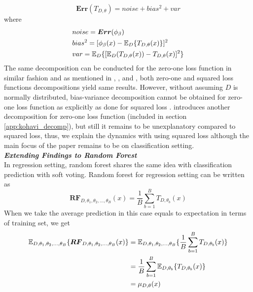 \begin{equation}
\boldsymbol{Err}(T_{D,\theta}) = noise + bias^2 + var
\end{equation}
\vspace{-3mm}
\qquad \qquad \qquad \quad where
\vspace{-6.3mm}
\begin{align}
& noise = \boldsymbol{Err}(\phi_{\beta}) \notag \\
& bias^2 = [\phi_{\beta}(x) - \mathbb{E}_{D}\{T_{D,\theta}(x)\}]^2 \notag \\
& var = \mathbb{E}_{D}\{[\mathbb{E}_{D}(T_{D,\theta}(x)) - T_{D,\theta}(x)]^2\} \notag
\end{align}
The same decomposition can be conducted for the zero-one loss function in similar fashion and as mentioned in 
\cite{louppe2014understanding}, \cite{domingos2000decomposition}, 
\cite{james2003variance} and \cite{friedman1997zeroLoss},
both zero-one and squared loss functions decompositions yield same results. 
However, without assuming $D$ is normally distributed, bias-variance decomposition 
cannot be obtained for zero-one loss function as explicitly as done for squared loss \cite{louppe2014understanding}. 
\cite{kohavi1996bias} introduces another decomposition for zero-one loss function (included in section \ref{app:kohavi_decomp}), 
but still it remains to be unexplanatory compared to squared loss, thus, 
we explain the dynamics with using squared loss although 
the main focus of the paper remains to be on classification setting.
\vspace{2mm}
\\
\textbf{\emph{Extending Findings to Random Forest }}\\
In regression setting, random forest shares the same idea with classification prediction with soft voting. 
Random forest for regression setting can be written as
\begin{equation}
\boldsymbol{RF}_{D, \theta_{1},\theta_{2},..., \theta_{B}}(x) = \dfrac{1}{B}\sum_{b = 1}^{B}T_{D,\theta_{b}}(x)
\end{equation}
When we take the average prediction in this case equals to expectation in terms of training set, we get
\begin{align}\label{eq:mu}
\mathbb{E}_{D, \theta_{1}, \theta_{2},..., \theta_{B}}\{\boldsymbol{RF}_{D, \theta_{1},\theta_{2},..., \theta_{B}}(x) \} 
	& = \mathbb{E}_{D, \theta_{1}, \theta_{2},..., \theta_{B}}\{\dfrac{1}{B}\sum_{b = 1}^{B}T_{D,\theta_{b}}(x)\} \notag \\
	& = \dfrac{1}{B}\sum_{b=1}^{B}\mathbb{E}_{D,\theta_{b}}\{T_{D, \theta_{b}}(x)\}\notag \\
	& = \mu_{D,\theta}(x)
\end{align}
